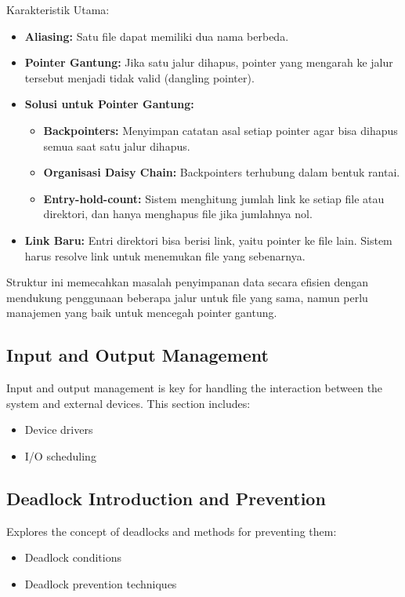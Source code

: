 \documentclass[12pt]{article}
\begin{document}
\begin{itemize}
\begin{enumerate}
\begin{enumerate}[label=\alph*.]
        Karakteristik Utama:
        \begin{itemize}
            \item \textbf{Aliasing:} Satu file dapat memiliki dua nama berbeda.
            \item \textbf{Pointer Gantung:} Jika satu jalur dihapus, pointer yang mengarah ke jalur tersebut menjadi tidak valid (dangling pointer).
            \item \textbf{Solusi untuk Pointer Gantung:}
            \begin{itemize}
                \item \textbf{Backpointers:} Menyimpan catatan asal setiap pointer agar bisa dihapus semua saat satu jalur dihapus.
                \item \textbf{Organisasi Daisy Chain:} Backpointers terhubung dalam bentuk rantai.
                \item \textbf{Entry-hold-count:} Sistem menghitung jumlah link ke setiap file atau direktori, dan hanya menghapus file jika jumlahnya nol.
            \end{itemize}
            \item \textbf{Link Baru:} Entri direktori bisa berisi link, yaitu pointer ke file lain. Sistem harus resolve link untuk menemukan file yang sebenarnya.
        \end{itemize}

        Struktur ini memecahkan masalah penyimpanan data secara efisien dengan mendukung penggunaan beberapa jalur untuk file yang sama, namun perlu manajemen yang baik untuk mencegah pointer gantung.
    \end{enumerate}
\end{enumerate}
        
\end{itemize}

\subsection{Input and Output Management}
Input and output management is key for handling the interaction between the system and external devices. This section includes:
\begin{itemize}
    \item Device drivers
    \item I/O scheduling
\end{itemize}

\subsection{Deadlock Introduction and Prevention}
Explores the concept of deadlocks and methods for preventing them:
\begin{itemize}
    \item Deadlock conditions
    \item Deadlock prevention techniques
\end{itemize}
\end{document}
